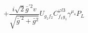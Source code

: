%
\begin{dmath*}
%
  +  \frac{i \sqrt{2} {\bar g}^{\prime 2} v}{\sqrt{{\bar g}^{\prime 2} + {\bar g}{}^2}}U_{g_1 f_2} C^{ \varphi  l3}_{f_1 g_1} \gamma^{\mu_4} P_L
%
\end{dmath*}
%
